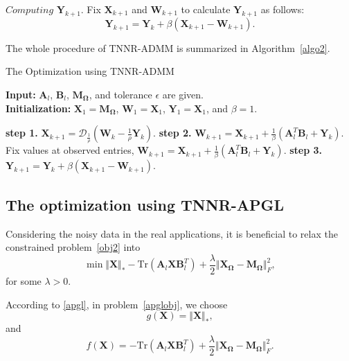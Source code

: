 \documentclass[fontset=windows]{article}
\begin{document}
{$\textit{Computing}$  $\mathbf Y_{k+1}$. Fix $\mathbf X_{k+1}$ and $\mathbf W_{k+1}$ to calculate $\mathbf Y_{k+1}$ as follows:
\begin{equation}
    \mathbf Y_{k+1} = \mathbf Y_{k} + \beta(\mathbf X_{k+1} - \mathbf W_{k+1}).
\end{equation}

The whole procedure of TNNR-ADMM is summarized in Algorithm~\ref{algo2}.


\begin{algorithm}[t]
    \caption{The Optimization using TNNR-ADMM}
    \label{algo2}
    \textbf{Input:} $\mathbf A_l$, $\mathbf B_l$, $\mathbf M_{\mathbf\Omega}$, and tolerance $\epsilon$ are given.\\
    \textbf{Initialization:} $\mathbf X_1 = \mathbf M_{\mathbf\Omega}$, $\mathbf W_1 = \mathbf X_1$, $\mathbf Y_1=\mathbf X_1$, and $\beta = 1$. 
    \begin{algorithmic}
        \Repeat 
        \State \textbf{step 1.} $\mathbf X_{k+1} = \mathcal{D}_{\frac{1}{\rho}}(\mathbf W_k - \frac{1}{\rho}\mathbf Y_k)$.
        \State \textbf{step 2.} $\mathbf W_{k+1} = \mathbf X_{k+1} + \frac{1}{\beta}(\mathbf A_l^T\mathbf B_l + \mathbf Y_k)$.
        \State Fix values at observed entries, 
        $\mathbf W_{k+1} = \mathbf X_{k+1} + \frac{1}{\beta}(\mathbf A_l^T\mathbf B_l + \mathbf Y_k)$.
        \State \textbf{step 3.} $\mathbf Y_{k+1} = \mathbf Y_{k} + \beta(\mathbf X_{k+1} -\mathbf W_{k+1})$.
    \end{algorithmic}
\end{algorithm}

\subsection{The optimization using TNNR-APGL}
Considering the noisy data in the real applications, it is beneficial to relax the constrained problem~\eqref{obj2} into
\begin{equation}
    \min \Vert\mathbf X \Vert_* - \text{Tr}(\mathbf A_l\mathbf X\mathbf B_l^T) + \frac{\lambda}{2}\Vert\mathbf X_{\mathbf\Omega} -\mathbf M_{\mathbf\Omega} \Vert^2_F,
    \label{apglobj}
\end{equation}
for some $\lambda >0$.

According to \eqref{apgl}, in problem~\eqref{apglobj}, we choose
\begin{equation*}
    g(\mathbf X) = \Vert\mathbf X \Vert_*,
\end{equation*}
and
\begin{equation*}
    f(\mathbf X) = - \text{Tr}(\mathbf A_l\mathbf X\mathbf B_l^T) + \frac{\lambda}{2}\Vert\mathbf X_{\mathbf\Omega} -\mathbf M_{\mathbf\Omega} \Vert^2_F.
\end{equation*}

}
\end{document}
